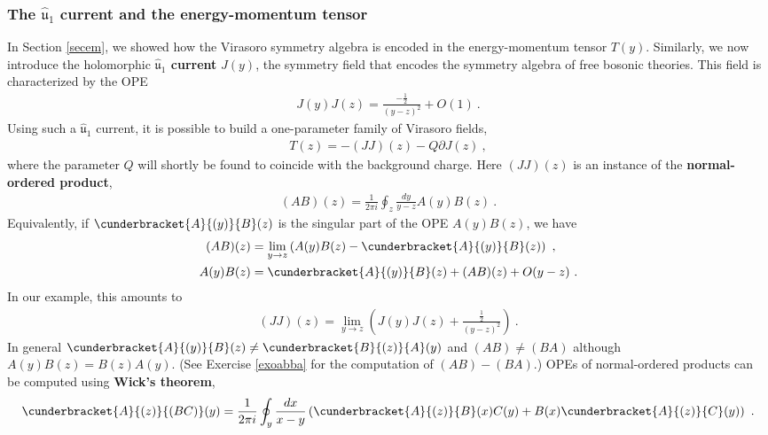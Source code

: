 \documentclass[12pt, a4paper, notitlepage, twoside]{report}
\numberwithin{equation}{section}
\theoremstyle{break}
\begin{document}
\subsubsection{The \boldmath $\hat{\mathfrak{u}}_1$ current and the energy-momentum tensor}

In Section \ref{secem}, we showed how the Virasoro symmetry algebra is encoded in the energy-momentum tensor $T(y)$.
Similarly, we now introduce the holomorphic \textbf{\boldmath $\hat{\mathfrak{u}}_1$ current} $J(y)$, the symmetry field that encodes the symmetry algebra of free bosonic theories.
This field is characterized by the OPE
\begin{align}
 \boxed{J(y)J(z) = \frac{-\frac12}{(y-z)^2} + O(1)}\ .
\label{jj}
\end{align}
Using such a $\hat{\mathfrak{u}}_1$ current, it is possible to build a one-parameter family of Virasoro fields,
\begin{align}
 \boxed{T(z) = -(JJ)(z) - Q\partial J(z)}\ ,
\label{tqz}
\end{align}
where the parameter $Q$ will shortly be found to coincide with the background charge. 
Here $(JJ)(z)$ is an instance of the \textbf{\boldmath normal-ordered product}, 
\begin{align}
 (AB)(z) = \frac{1}{2\pi i} \oint_z \frac{dy}{y-z} A(y)B(z)\ .
\label{abz}
\end{align}
Equivalently, if $\cunderbracket{A}{(y)}{B}(z)$ is the singular part of the OPE $A(y)B(z)$,
we have
\begin{align}
(AB)(z) &= \underset{y\to z}{\lim} \left(A(y)B(z)-\cunderbracket{A}{(y)}{B}(z)\right)\ ,
\\
 A(y)B(z) &= \cunderbracket{A}{(y)}{B}(z) + (AB)(z) + O(y-z)\ .
 \label{abope}
\end{align}
In our example, this amounts to
\begin{align}
 (JJ)(z) = \underset{y\to z}{\lim} \left( J(y)J(z) + \frac{\frac12}{(y-z)^2}\right)\ .
\end{align}
In general $\cunderbracket{A}{(y)}{B}(z) \neq \cunderbracket{B}{(z)}{A}(y)$ and $(AB)\neq (BA)$ although $A(y)B(z)=B(z)A(y)$.
(See Exercise \ref{exoabba} for the computation of $(AB)-(BA)$.)
OPEs of normal-ordered products can be computed using \textbf{\boldmath Wick's theorem},
\begin{align}
 \cunderbracket{A}{(z)}{(BC)}(y) = \frac{1}{2\pi i}\oint_y \frac{dx}{x-y}\left(\cunderbracket{A}{(z)}{B}(x)C(y) + B(x)\cunderbracket{A}{(z)}{C}(y)\right)\ .
\label{wick}
\end{align}
\end{document}
